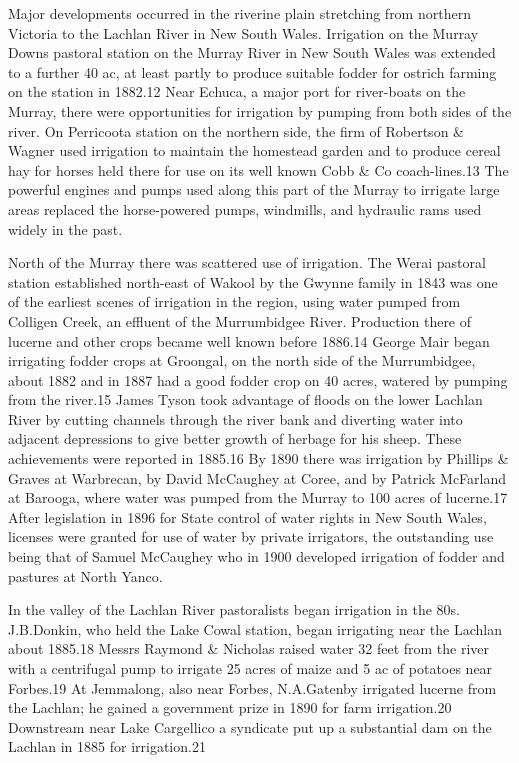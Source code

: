 Major developments occurred in the riverine plain stretching from
northern Victoria to the Lachlan River in New South Wales. Irrigation
on the Murray Downs pastoral station on the Murray River in New South
Wales was extended to a further 40 ac, at least partly to produce
suitable fodder for ostrich farming on the station in 1882.12 Near
Echuca, a major port for river-boats on the Murray, there were
opportunities for irrigation by pumping from both sides of the
river. On Perricoota station on the northern side, the firm of
Robertson \& Wagner used irrigation to maintain the homestead garden
and to produce cereal hay for horses held there for use on its well
known Cobb \& Co coach-lines.13 The powerful engines and pumps used
along this part of the Murray to irrigate large areas replaced the
horse-powered pumps, windmills, and hydraulic rams used widely in the
past.

North of the Murray there was scattered use of irrigation. The Werai
pastoral station established north-east of Wakool by the Gwynne family
in 1843 was one of the earliest scenes of irrigation in the region,
using water pumped from Colligen Creek, an effluent of the
Murrumbidgee River. Production there of lucerne and other crops became
well known before 1886.14 George Mair began irrigating fodder crops at
Groongal, on the north side of the Murrumbidgee, about 1882 and in
1887 had a good fodder crop on 40 acres, watered by pumping from the
river.15 James Tyson took advantage of floods on the lower Lachlan
River by cutting channels through the river bank and diverting water
into adjacent depressions to give better growth of herbage for his
sheep. These achievements were reported in 1885.16 By 1890 there was
irrigation by Phillips \& Graves at Warbrecan, by David McCaughey at
Coree, and by Patrick McFarland at Barooga, where water was pumped
from the Murray to 100 acres of lucerne.17 After legislation in 1896
for State control of water rights in New South Wales, licenses were
granted for use of water by private irrigators, the outstanding use
being that of Samuel McCaughey who in 1900 developed irrigation of
fodder and pastures at North Yanco.

In the valley of the Lachlan River pastoralists began irrigation in
the 80s. J.B.Donkin, who held the Lake Cowal station, began irrigating
near the Lachlan about 1885.18 Messrs Raymond \& Nicholas raised water
32 feet from the river with a centrifugal pump to irrigate 25 acres of
maize and 5 ac of potatoes near Forbes.19 At Jemmalong, also near
Forbes, N.A.Gatenby irrigated lucerne from the Lachlan; he gained a
government prize in 1890 for farm irrigation.20 Downstream near Lake
Cargellico a syndicate put up a substantial dam on the Lachlan in 1885
for irrigation.21


